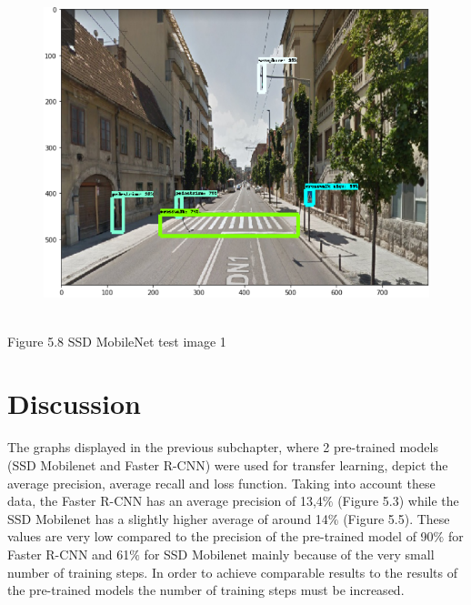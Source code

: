 \documentclass[12pt]{report}
\renewcommand{\_}{\kern-1.5pt\textunderscore\kern-1.5pt}
\begin{document}
\begin{figure}[H]
	\begin{Center}
		\includegraphics[width=4.98in,height=3.74in]{./media/image7.png}
	\end{Center}
\end{figure}



\par

\begin{Center}
Figure 5.8 SSD MobileNet test image 1
\end{Center}\par


\vspace{\baselineskip}
\section{Discussion}
The graphs displayed in the previous subchapter, where 2 pre-trained models (SSD Mobilenet and Faster R-CNN) were used for transfer learning, depict the average precision, average recall and loss function. Taking into account these data, the Faster R-CNN has an average precision of 13,4$\%$  (Figure 5.3) while the SSD Mobilenet has a slightly higher average of around 14$\%$  (Figure 5.5). These values are very low compared to the precision of the pre-trained model of 90$\%$  for Faster R-CNN and 61$\%$  for SSD Mobilenet mainly because of the very small number of training steps. In order to achieve comparable results to the results of the pre-trained models the number of training steps must be increased.\par
\end{document}
